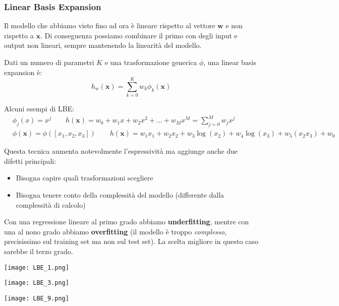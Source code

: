 \subsubsection{Linear Basis Expansion}
Il modello che abbiamo visto fino ad ora è lineare rispetto al vettore $\mathbf{w}$ e non rispetto a $\mathbf{x}$. Di conseguenza possiamo combinare il primo con degli input e output non lineari, sempre mantenendo la linearità del modello.
\begin{definition}[LBE]
	Dati un numero di parametri $K$ e una trasformazione generica $\phi$, una linear basis expansion è:
	\begin{equation}
		h_w(\mathbf{x}) = \sum_{k=0}^{K}w_k \phi_k(\mathbf{x})
	\end{equation}
\end{definition}
\begin{example}[LBE]
	Alcuni esempi di LBE:
	\begin{align*}
		&  \phi_j(x)=x^j \quad\quad h(\mathbf{x})=w_0+w_1x+w_2x^2+\ldots+w_Mx^M = \sum_{j=0}^{M}w_jx^j\\
		& \phi(\mathbf{x})=\phi([x_1,x_2,x_3]) \quad\quad h(\mathbf{x})=w_1x_1+w_2x_2 + w_3 \log(x_2)+w_4 \log (x_3) + w_5(x_2x_3)+w_0
	\end{align*}
\end{example}
\noindent Questa tecnica aumenta notevolmente l'espressività ma aggiunge anche due difetti principali:
\begin{itemize}
	\item Bisogna capire quali trasformazioni scegliere
	\item Bisogna tenere conto della complessità del modello (differente dalla complessità di calcolo)
\end{itemize}
\begin{example}
	\label{example:LBE}
	Con una regressione lineare al primo grado abbiamo \textbf{underfitting}, mentre con una al nono grado abbiamo \textbf{overfitting} (il modello è troppo \textit{complesso}, precisissimo sul training set ma non sul test set). La scelta migliore in questo caso sarebbe il terzo grado.
	\begin{center}
		\begin{minipage}{0.48\linewidth}
			\centering
			\texttt{[image: LBE\_1.png]}
		\end{minipage}
		\begin{minipage}{0.48\linewidth}
			\centering
			\texttt{[image: LBE\_3.png]}
		\end{minipage}
		\texttt{[image: LBE\_9.png]}
	\end{center}
\end{example}

